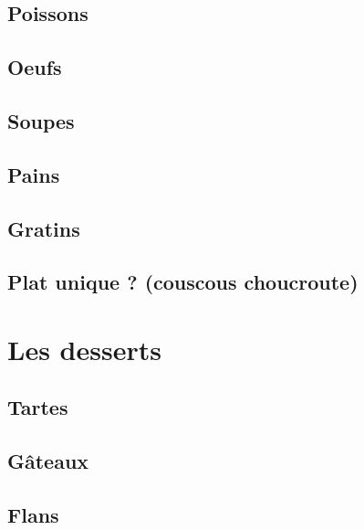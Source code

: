 \documentclass[A4paper,twoside, 12pt]{book}
\begin{document}
	\chapter{Poissons}
	
	\chapter{Oeufs}
	\chapter{Soupes}



	\chapter{Pains}
	\chapter{Gratins}
	\chapter{Plat unique ? (couscous choucroute)}



		

\part{Les desserts}
	\chapter{Tartes}


	\chapter{G\^ateaux}





		
	\chapter{Flans}

\end{document}
